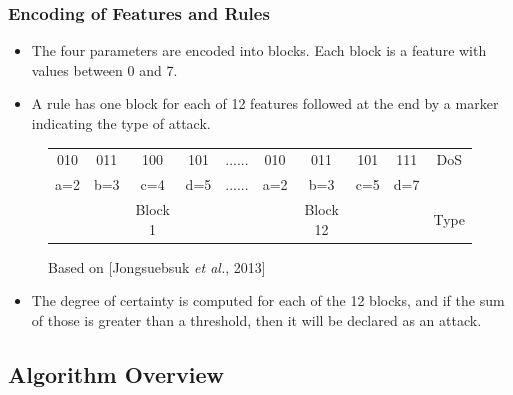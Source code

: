\documentclass{beamer}
\begin{document}
\begin{frame}
	\frametitle{Encoding of Features and Rules}
	\begin{itemize}
	\item The four parameters are encoded into blocks. Each block is a feature with values between 0 and 7.
	

	\item A rule has one block for each of 12 features followed at the end by a marker indicating the type of attack.
	\end{itemize}

\begin{figure}
\begin{small}
\begin{tabular}{|cccc|c|cccc|c|} \hline
010 & 011 & 100 & 101   & ...... & 010 & 011 & 101 & 111   & DoS\\
a=2 & b=3 & c=4 & d=5   & ...... & a=2 & b=3 & c=5 & d=7   &\\ 
    &     & Block 1&    &        &     & Block 12& &       & Type\\
\hline\end{tabular}
\caption{Based on [Jongsuebsuk \emph{et al.}, 2013]}
\end{small}
\end{figure}

	\begin{itemize}
		\item The degree of certainty is computed for each of the 12 blocks, and if the sum of those is greater than a threshold, then it will be declared as an attack.
	\end{itemize}

\end{frame}


\subsection{Algorithm Overview}
\end{document}
